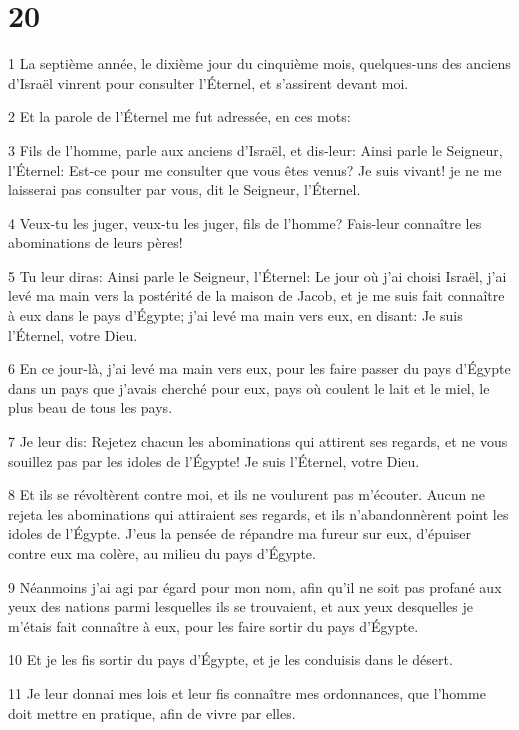 \chapter{20}

\par 1 La septième année, le dixième jour du cinquième mois, quelques-uns des anciens d'Israël vinrent pour consulter l'Éternel, et s'assirent devant moi.
\par 2 Et la parole de l'Éternel me fut adressée, en ces mots:
\par 3 Fils de l'homme, parle aux anciens d'Israël, et dis-leur: Ainsi parle le Seigneur, l'Éternel: Est-ce pour me consulter que vous êtes venus? Je suis vivant! je ne me laisserai pas consulter par vous, dit le Seigneur, l'Éternel.
\par 4 Veux-tu les juger, veux-tu les juger, fils de l'homme? Fais-leur connaître les abominations de leurs pères!
\par 5 Tu leur diras: Ainsi parle le Seigneur, l'Éternel: Le jour où j'ai choisi Israël, j'ai levé ma main vers la postérité de la maison de Jacob, et je me suis fait connaître à eux dans le pays d'Égypte; j'ai levé ma main vers eux, en disant: Je suis l'Éternel, votre Dieu.
\par 6 En ce jour-là, j'ai levé ma main vers eux, pour les faire passer du pays d'Égypte dans un pays que j'avais cherché pour eux, pays où coulent le lait et le miel, le plus beau de tous les pays.
\par 7 Je leur dis: Rejetez chacun les abominations qui attirent ses regards, et ne vous souillez pas par les idoles de l'Égypte! Je suis l'Éternel, votre Dieu.
\par 8 Et ils se révoltèrent contre moi, et ils ne voulurent pas m'écouter. Aucun ne rejeta les abominations qui attiraient ses regards, et ils n'abandonnèrent point les idoles de l'Égypte. J'eus la pensée de répandre ma fureur sur eux, d'épuiser contre eux ma colère, au milieu du pays d'Égypte.
\par 9 Néanmoins j'ai agi par égard pour mon nom, afin qu'il ne soit pas profané aux yeux des nations parmi lesquelles ils se trouvaient, et aux yeux desquelles je m'étais fait connaître à eux, pour les faire sortir du pays d'Égypte.
\par 10 Et je les fis sortir du pays d'Égypte, et je les conduisis dans le désert.
\par 11 Je leur donnai mes lois et leur fis connaître mes ordonnances, que l'homme doit mettre en pratique, afin de vivre par elles.
